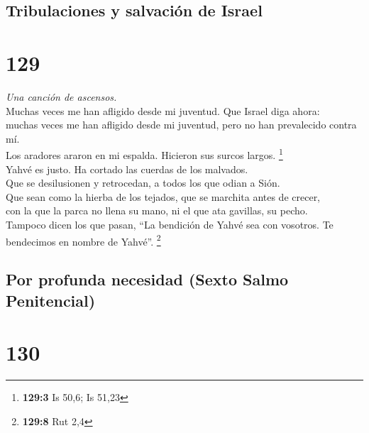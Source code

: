 \hypertarget{tribulaciones-y-salvaciuxf3n-de-israel}{%
\subsection{Tribulaciones y salvación de
Israel}\label{tribulaciones-y-salvaciuxf3n-de-israel}}

\hypertarget{section-126}{%
\section{129}\label{section-126}}

\emph{Una canción de ascensos.}\\
 Muchas veces me han afligido desde mi juventud. Que
Israel diga ahora:\\
 muchas veces me han afligido desde mi juventud, pero no
han prevalecido contra mí.\\
 Los aradores araron en mi espalda. Hicieron sus surcos
largos. \footnote{\textbf{129:3} Is 50,6; Is 51,23}\\
 Yahvé es justo. Ha cortado las cuerdas de los malvados.\\
 Que se desilusionen y retrocedan, a todos los que odian a
Sión.\\
 Que sean como la hierba de los tejados, que se marchita
antes de crecer,\\
 con la que la parca no llena su mano, ni el que ata
gavillas, su pecho.\\
 Tampoco dicen los que pasan, ``La bendición de Yahvé sea
con vosotros. Te bendecimos en nombre de Yahvé''. \footnote{\textbf{129:8}
  Rut 2,4}

\hypertarget{por-profunda-necesidad-sexto-salmo-penitencial}{%
\subsection{Por profunda necesidad (Sexto Salmo
Penitencial)}\label{por-profunda-necesidad-sexto-salmo-penitencial}}

\hypertarget{section-127}{%
\section{130}\label{section-127}}

